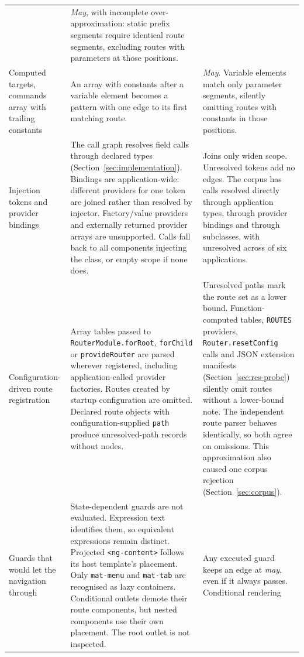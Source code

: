 \begin{xltabular}{\textwidth}{@{}>{\raggedright\arraybackslash}p{2.7cm}YY@{}}
& \emph{May}, with incomplete over-approximation: static prefix segments require identical
route segments, excluding routes with parameters at those positions. \\
Computed targets, commands array with trailing constants
& An array with constants after a variable element becomes a pattern with one edge to its first matching route.
& \emph{May}. Variable elements match only parameter segments, silently omitting routes with constants in those positions. \\
Injection tokens and provider bindings
& The call graph resolves field calls through declared types (Section~\ref{sec:implementation}).
Bindings are application-wide: different providers for one token are joined rather than resolved by
injector. Factory/value providers and externally returned provider arrays are unsupported. Calls fall
back to all components injecting the class, or empty scope if none does.
& Joins only widen scope. Unresolved tokens add no edges. The corpus has \CGDirect{} calls resolved
directly through application types, \CGBound{} through provider bindings and \CGSubclass{} through
subclasses, with \CGUnresolved{} unresolved across \CGUnresolvedApps{} of six applications. \\
Configuration-driven route registration
& Array tables passed to \texttt{RouterModule.forRoot}, \texttt{forChild} or \texttt{provideRouter}
are parsed wherever registered, including application-called provider factories. Routes created by
startup configuration are omitted. Declared route objects with configuration-supplied \texttt{path}
produce unresolved-path records without nodes.
& Unresolved paths mark the route set as a lower bound. Function-computed tables, \texttt{ROUTES}
providers, \texttt{Router.resetConfig} calls and JSON extension manifests (Section~\ref{sec:res-probe})
silently omit routes without a lower-bound note. The independent route parser behaves identically, so
both agree on omissions. This approximation also caused one corpus rejection (Section~\ref{sec:corpus}). \\
Guards that would let the navigation through
& State-dependent guards are not evaluated. Expression text identifies them, so equivalent expressions
remain distinct. Projected \texttt{<ng-content>} follows its host template's placement.
Only \texttt{mat-menu} and \texttt{mat-tab} are recognised as lazy containers. Conditional outlets demote
their route components, but nested components use their own placement. The root outlet is not inspected.
& Any executed guard keeps an edge at \emph{may}, even if it always passes. Conditional rendering

\end{xltabular}
